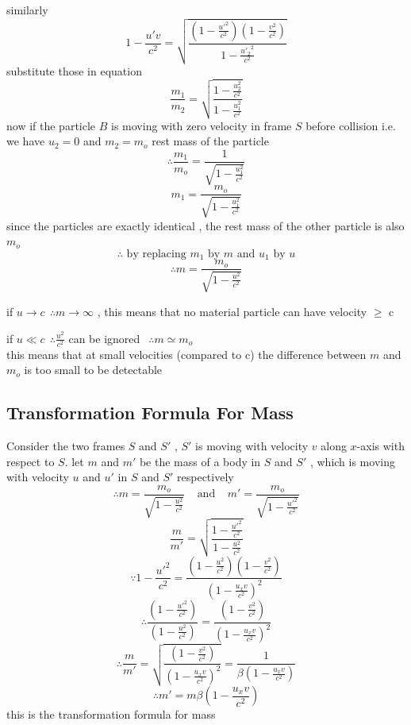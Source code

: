 \documentclass{article}
\begin{document}
similarly
\[
    1-\frac{u' v}{c^2} = \sqrt{\frac{\left( 1 -\frac{{u'}^2}{c^2}\right) \left(1 - \frac{v^2}{c^2}\right)}{1-\frac{{u'_2}^2}{c^2}}}    
\]
substitute those in equation 
\[
    \frac{m_1}{m_2} = \sqrt{\frac{1 - \frac{u^2_2}{c^2}}{1 - \frac{u^2_1}{c^2}}}    
\]
now if the particle $B$ is moving with zero velocity in frame $S$ before collision i.e.
we have $u_2=0$ and $m_2=m_o$ rest mass of the particle
\[
\therefore  \frac{m_1}{m_o} = \frac{1}{\sqrt{1 - \frac{u^2_1}{c^2}}} 
\]
\[
    m_1 = \frac{m_o}{\sqrt{1 - \frac{u^2_1}{c^2}}} 
\]
since the particles are exactly identical , the rest mass of the other particle is also $m_o$
\[
\therefore \text{ by replacing } m_1 \text{ by } m \text{ and } u_1 \text{ by } u
\]
\[
\therefore     m = \frac{m_o}{\sqrt{1 - \frac{u^2}{c^2}}} 
\]
\begin{observation}
    if $ u \to c \ \ \therefore m \to \infty$ , this means that no material particle can have velocity $\geq$ c
\end{observation}
\begin{observation}
    if $ u \ll c \ \ \therefore \frac{u^2}{c^2} $ can be ignored $ \ \ \therefore m \simeq m_o $\\
    this means that at small velocities (compared to c) the difference between $m$ and $m_o$ is too small to be detectable
\end{observation}
\subsection{Transformation Formula For Mass}
Consider the two frames $S$ and $S'$ , $S'$ is moving with velocity $v$ along $x$-axis with respect to $S$. let $m$ and $m'$ be the mass of a body in $S$ and $S'$ , which is moving with velocity $u$ and $u'$ in $S$ and $S'$ respectively
\[
\therefore     m = \frac{m_o}{\sqrt{1 - \frac{u^2}{c^2}}}  \ \ \ \ \  \text{and} \ \ \ \ \ m' = \frac{m_o}{\sqrt{1 - \frac{{u'}^2}{c^2}}} 
\]
\[
    \frac{m}{m'} = \sqrt{\frac{1 - \frac{{u'}^2}{c^2}}{1 - \frac{u^2}{c^2}}}        
\]
\[
\because 1-\frac{{u'}^2}{c^2} = \frac{\left( 1 -\frac{u^2}{c^2}\right) \left(1 - \frac{v^2}{c^2}\right)}{{\left(1-\frac{u_x v}{c^2}\right)}^2}    
\]
\[
\therefore \frac{\left(1-\frac{{u'}^2}{c^2}\right)}{\left( 1 -\frac{u^2}{c^2}\right)} = \frac{\left(1 - \frac{v^2}{c^2}\right)}{{\left(1-\frac{u_x v}{c^2}\right)}^2}     
\]
\[
\therefore \frac{m}{m'}  =\sqrt{\frac{\left(1 - \frac{v^2}{c^2}\right)}{{\left(1-\frac{u_x v}{c^2}\right)}^2}} = \frac{1}{\beta\left(1-\frac{u_x v}{c^2}\right)}
\]
\[
\therefore m' = m \beta\left(1-\frac{u_x v}{c^2}\right)
\]
this is the transformation formula for mass
\end{document}
